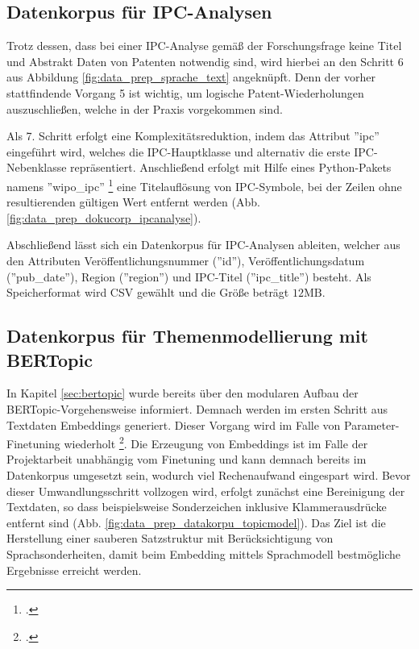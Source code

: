 \subsection{Datenkorpus für \ac{IPC}-Analysen}\label{sec:data_korp_ipc}

Trotz dessen, dass bei einer \ac{IPC}-Analyse gemäß der Forschungsfrage keine Titel und Abstrakt Daten von Patenten notwendig sind, wird hierbei an den Schritt 6 aus Abbildung \ref{fig:data_prep_sprache_text} angeknüpft. Denn der vorher stattfindende Vorgang 5 ist wichtig, um logische Patent-Wiederholungen auszuschließen, welche in der Praxis vorgekommen sind. 

Als 7. Schritt erfolgt eine Komplexitätsreduktion, indem das Attribut ''ipc'' eingeführt wird, welches die \ac{IPC}-Hauptklasse und alternativ die erste \ac{IPC}-Nebenklasse repräsentiert. Anschließend erfolgt mit Hilfe eines Python-Pakets namens ''wipo\_ipc'' \footcite{wipo_ipc} eine Titelauflösung von IPC-Symbole, bei der Zeilen ohne resultierenden gültigen Wert entfernt werden (Abb. \ref{fig:data_prep_dokucorp_ipcanalyse}). 

Abschließend lässt sich ein Datenkorpus für \ac{IPC}-Analysen ableiten, welcher aus den Attributen Veröffentlichungsnummer (''id''), Veröffentlichungsdatum (''pub\_date''), Region (''region'') und \ac{IPC}-Titel (''ipc\_title'') besteht. Als Speicherformat wird CSV gewählt und die Größe beträgt $12\text{MB}$.

\subsection{Datenkorpus für Themenmodellierung mit BERTopic}\label{sec:datakorp_for_topicmodel}

In Kapitel \ref{sec:bertopic} wurde bereits über den modularen Aufbau der BERTopic-Vorgehensweise informiert. Demnach werden im ersten Schritt aus Textdaten Embeddings generiert. Dieser Vorgang wird im Falle von Parameter-Finetuning wiederholt \footcite{website:bertopic_bestpractices}. Die Erzeugung von Embeddings ist im Falle der Projektarbeit unabhängig vom Finetuning und kann demnach bereits im Datenkorpus umgesetzt sein, wodurch viel Rechenaufwand eingespart wird. Bevor dieser Umwandlungsschritt vollzogen wird, erfolgt zunächst eine Bereinigung der Textdaten, so dass beispielsweise Sonderzeichen inklusive Klammerausdrücke entfernt sind (Abb. \ref{fig:data_prep_datakorpu_topicmodel}). Das Ziel ist die Herstellung einer sauberen Satzstruktur mit Berücksichtigung von Sprachsonderheiten, damit beim Embedding mittels Sprachmodell bestmögliche Ergebnisse erreicht werden.

